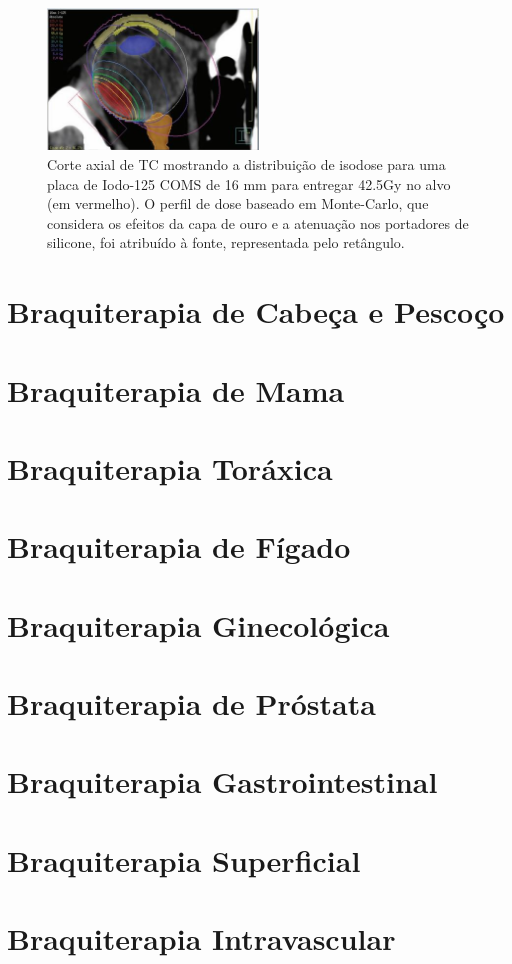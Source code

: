 \documentclass[11pt,a4paper]{article}
\begin{document}
    \begin{figure}[h]
        \centering
        \includegraphics[width=0.5\textwidth]{Imagens/distribDosePlacaComsI125.JPG}
        \caption{Corte axial de TC mostrando a distribuição de isodose para uma placa de Iodo-125 COMS de 16 mm para entregar 42.5Gy no alvo (em vermelho). O perfil de dose baseado em Monte-Carlo, que considera os efeitos da capa de ouro e a atenuação nos portadores de silicone, foi atribuído à fonte, representada pelo retângulo.}
    \end{figure}
 


    \section{Braquiterapia de Cabeça e Pescoço}



    \section{Braquiterapia de Mama}

    \section{Braquiterapia Toráxica}

    \section{Braquiterapia de Fígado}

    \section{Braquiterapia Ginecológica}
    
    \section{Braquiterapia de Próstata}

    \section{Braquiterapia Gastrointestinal}

    \section{Braquiterapia Superficial}

    \section{Braquiterapia Intravascular}




\end{document}
